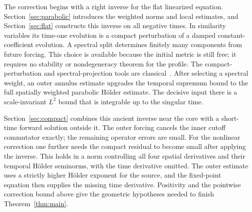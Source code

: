 The correction begins with a right inverse for the flat linearized
equation. Section~\ref{sec:parabolic} introduces the weighted norms
and local estimates, and Section~\ref{sec:flat} constructs this inverse
on all negative times. In similarity variables its time-one evolution
is a compact perturbation of a damped constant-coefficient evolution.
A spectral split determines finitely many components from future
forcing. This choice is available because the initial metric is still
free; it requires no stability or nondegeneracy theorem for the
profile. The compact-perturbation and spectral-projection tools are
classical~\cite{Kato1995}. After selecting a spectral weight, an outer
annulus estimate upgrades the temporal supremum bound to the full
spatially weighted parabolic H\"older estimate. The decisive input
there is a scale-invariant \(L^2\) bound that is integrable up to
the singular time.

Section~\ref{sec:compact} combines this ancient inverse near the core
with a short-time forward solution outside it. The outer forcing
cancels the inner cutoff commutator exactly; the remaining operator
errors are small. For the nonlinear correction one further needs the
compact residual to become small after applying the inverse. This
holds in a norm controlling all four spatial derivatives and their
temporal H\"older seminorms, with the time derivative omitted.
The outer estimate uses a strictly higher H\"older exponent for the
source, and the fixed-point equation then supplies the missing time
derivative. Positivity and the pointwise correction bound above give
the geometric hypotheses needed to finish Theorem~\ref{thm:main}.

